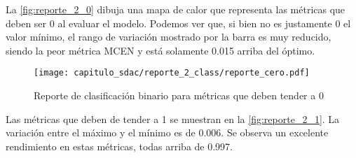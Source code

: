 \begin{table}[H]
    \centering
    \caption{Métricas de clasificación binaria}\label{tabla:reporte_completo_2}
    \end{table}

La \autoref{fig:reporte_2_0} dibuja una mapa de calor que representa las
métricas que deben ser 0 al evaluar el modelo. Podemos ver que, si bien no es
justamente 0 el valor mínimo, el rango de variación mostrado por la barra es muy
reducido, siendo la peor métrica MCEN y está solamente 0.015 arriba del óptimo.

\begin{figure}[]
    \centering
    \texttt{[image: capitulo\_sdac/reporte\_2\_class/reporte\_cero.pdf]}
    \caption{Reporte de clasificación binario para métricas que deben tender a 0}\label{fig:reporte_2_0}
\end{figure}

Las métricas que deben de tender a 1 se muestran en la
\autoref{fig:reporte_2_1}. La variación entre el máximo y el mínimo es de 0.006. Se observa
un excelente rendimiento en estas métricas, todas arriba de 0.997.

